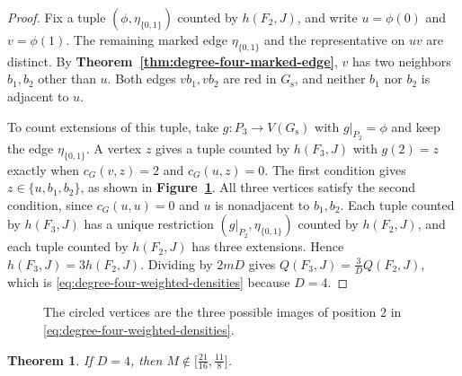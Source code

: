 \documentclass[preprint,11pt,numbers]{elsarticle-arxiv}
\numberwithin{equation}{section}
\newtheorem{theorem}{Theorem}[section]
\theoremstyle{definition}
\begin{document}
\begin{proof}
Fix a tuple $(\phi,\eta_{\{0,1\}})$ counted by $h(F_2,J)$,
and write $u=\phi(0)$ and $v=\phi(1)$. The remaining marked
edge $\eta_{\{0,1\}}$ and the representative on $uv$ are
distinct. By \textbf{Theorem~\ref{thm:degree-four-marked-edge}},
$v$ has two neighbors $b_1,b_2$ other than $u$. Both edges
$vb_1,vb_2$ are red in $G_{\mathrm s}$, and neither $b_1$ nor
$b_2$ is adjacent to $u$.

To count extensions of this tuple, take
$g\colon P_3\to V(G_{\mathrm s})$ with $g|_{P_2}=\phi$ and keep
the edge $\eta_{\{0,1\}}$. A vertex $z$ gives a tuple counted by
$h(F_3,J)$ with $g(2)=z$ exactly when $c_G(v,z)=2$ and $c_G(u,z)=0$.
The first condition gives $z\in\{u,b_1,b_2\}$, as shown in
\textbf{Figure~\ref{fig:degree-four-marked-edge}}. All three
vertices satisfy the second condition, since $c_G(u,u)=0$
and $u$ is nonadjacent to $b_1,b_2$. Each tuple counted by
$h(F_3,J)$ has a unique restriction
$(g|_{P_2},\eta_{\{0,1\}})$ counted by $h(F_2,J)$, and each
tuple counted by $h(F_2,J)$ has three extensions. Hence
$h(F_3,J)=3h(F_2,J)$. Dividing by $2mD$ gives
$Q(F_3,J)=\frac{3}{D}Q(F_2,J)$, which is
\eqref{eq:degree-four-weighted-densities} because $D=4$.
\end{proof}

\begin{figure}[htbp]
\centering
{}
\caption{The circled vertices are the three possible images of
position $2$ in \eqref{eq:degree-four-weighted-densities}.}
\label{fig:degree-four-marked-edge}
\end{figure}

\begin{theorem}\label{thm:degree-four-interval}
If $D=4$, then $M\notin\bigl[\frac{21}{16},\frac{11}{8}\bigr]$.
\end{theorem}
\end{document}
